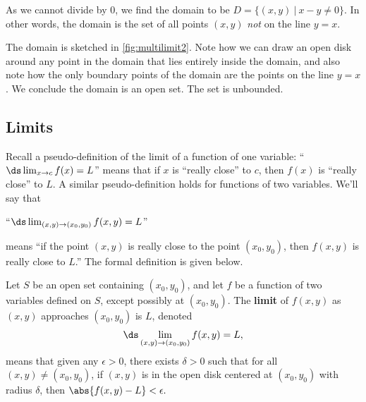 {As we cannot divide by 0, we find the domain to be $D = \{(x,y)\ |\ x-y\neq 0\}$. In other words, the domain is the set of all points $(x,y)$ \emph{not} on the line $y=x$. 


The domain is sketched in \autoref{fig:multilimit2}. Note how we can draw an open disk around any point in the domain that lies entirely inside the domain, and also note how the only boundary points of the domain are the points on the line $y=x$. We conclude the domain is an open set. The set is unbounded.}

\subsection{Limits}

Recall a pseudo-definition of the limit of a function of one variable: ``$\ds \lim_{x\to c}f(x) = L$'' means that if $x$ is ``really close'' to $c$, then $f(x)$ is ``really close'' to $L$. A similar pseudo-definition holds for functions of two variables. We'll say that 

\begin{center}
``$\ds \lim_{(x,y)\to (x_0,y_0)} f(x,y) = L$''
\end{center}
means ``if the point $(x,y)$ is really close to the point $(x_0,y_0)$, then $f(x,y)$ is really close to $L$.'' The formal definition is given below.

\begin{definition}\label{def:multilimit}
Let $S$ be an open set containing $(x_0,y_0)$, and let $f$ be a function of two variables defined on $S$, except possibly at $(x_0,y_0)$. 
The \textbf{limit} of $f(x,y)$ as $(x,y)$ approaches $(x_0,y_0)$ is $L$, denoted
\[\ds \lim_{(x,y)\to (x_0,y_0)} f(x,y) = L,\]
means that given any $\epsilon>0$, there exists $\delta>0$ such that for all  $(x,y)\neq (x_0,y_0)$, if $(x,y)$ is in the open disk centered at $(x_0,y_0)$ with radius $\delta$, then $\abs{f(x,y)-L}<\epsilon.$
\end{definition}

